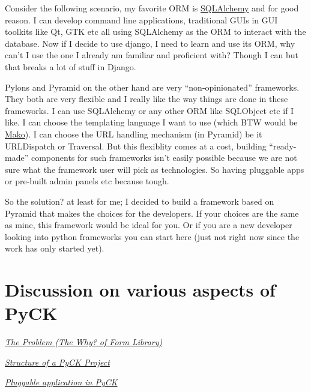 \documentclass[letterpaper,10pt,english]{sphinxmanual}
\begin{document}
Consider the following scenario, my favorite ORM is \href{http://www.sqlalchemy.org/}{SQLAlchemy} and for good reason. I can develop command line applications, traditional GUIs in GUI toolkits like Qt, GTK etc all using SQLAlchemy as the ORM to interact with the database. Now if I decide to use django, I need to learn and use its ORM, why can't I use the one I already am familiar and proficient with? Though I can but that breaks a lot of stuff in Django.

Pylons and Pyramid on the other hand are very ``non-opinionated'' frameworks. They both are very flexible and I really like the way things are done in these frameworks. I can use SQLAlchemy or any other ORM like SQLObject etc if I like. I can choose the templating language I want to use (which BTW would be \href{http://www.makotemplates.org/}{Mako}). I can choose the URL handling mechanism (in Pyramid) be it URLDispatch or Traversal. But this flexiblity comes at a cost, building ``ready-made'' components for such frameworks isn't easily possible because we are not sure what the framework user will pick as technologies. So having pluggable apps or pre-built admin panels etc because tough.

So the solution? at least for me; I decided to build a framework based on Pyramid that makes the choices for the developers. If your choices are the same as mine, this framework would be ideal for you. Or if you are a new developer looking into python frameworks you can start here (just not right now since the work has only started yet).


\section{Discussion on various aspects of PyCK}
\label{README:discussion-on-various-aspects-of-pyck}
{\hyperref[form-validation-library-choice:forms-library-choice]{\emph{The Problem (The Why? of Form Library)}}}

{\hyperref[pyck-project-structure:pyck-project-structure]{\emph{Structure of a PyCK Project}}}

{\hyperref[pluggable-apps-howto:pluggable-apps]{\emph{Pluggable application in PyCK}}}
\end{document}
